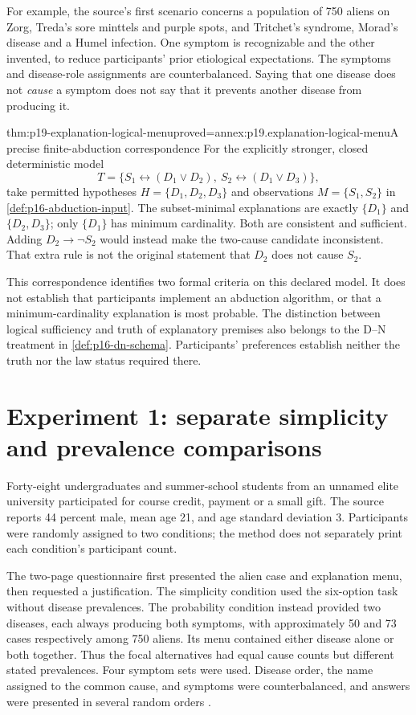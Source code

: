 For example, the source's first scenario concerns a population of
750 aliens on Zorg, Treda's sore minttels and purple spots, and
Tritchet's syndrome, Morad's disease and a Humel infection.
One symptom is recognizable and the other invented, to reduce
participants' prior etiological expectations. The symptoms and
disease-role assignments are counterbalanced.
Saying that one disease does not \emph{cause} a symptom does
not say that it prevents another disease from producing it.

\begin{hbtheorem}{thm:p19-explanation-logical-menu}{proved=annex:p19.explanation-logical-menu}{A precise finite-abduction correspondence}
For the explicitly stronger, closed deterministic model
\[
 T=\{S_1\leftrightarrow(D_1\lor D_2),\
      S_2\leftrightarrow(D_1\lor D_3)\},
\]
take permitted hypotheses \(H=\{D_1,D_2,D_3\}\) and observations
\(M=\{S_1,S_2\}\) in \cref{def:p16-abduction-input}.
The subset-minimal explanations are exactly
\(\{D_1\}\) and \(\{D_2,D_3\}\); only \(\{D_1\}\) has minimum
cardinality. Both are consistent and sufficient.
Adding \(D_2\to\neg S_2\) would instead make the two-cause
candidate inconsistent. That extra rule is not the original
statement that \(D_2\) does not cause \(S_2\).
\end{hbtheorem}

This correspondence identifies two formal criteria on this declared
model. It does not establish that participants implement an abduction
algorithm, or that a minimum-cardinality explanation is most probable.
The distinction between logical sufficiency and truth of explanatory
premises also belongs to the D--N treatment in
\cref{def:p16-dn-schema}. Participants' preferences establish neither
the truth nor the law status required there.

\section{Experiment 1: separate simplicity and prevalence comparisons}
\label{sec:p19-explanation-experiment-one}

Forty-eight undergraduates and summer-school students from an
unnamed elite university participated for course credit, payment
or a small gift. The source reports 44 percent male, mean age 21,
and age standard deviation 3. Participants were randomly assigned
to two conditions; the method does not separately print each
condition's participant count.

The two-page questionnaire first presented the alien case and
explanation menu, then requested a justification.
The simplicity condition used the six-option task without disease
prevalences. The probability condition instead provided two
diseases, each always producing both symptoms, with approximately
50 and 73 cases respectively among 750 aliens. Its menu contained
either disease alone or both together. Thus the focal alternatives
had equal cause counts but different stated prevalences.
Four symptom sets were used. Disease order, the name assigned to
the common cause, and symptoms were counterbalanced, and answers
were presented in several random orders
\cite[pp.~236--237]{Lombrozo2007SimplicityProbability}.

